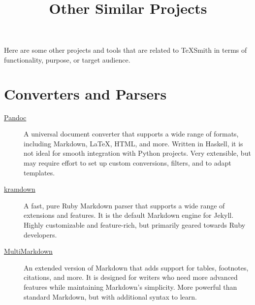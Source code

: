 \documentclass[a4paper,twoside]{article}
\title{Other Similar Projects}
\author{}\date{}
\begin{document}
\maketitle
Here are some other projects and tools that are related to TeXSmith in terms of functionality, purpose, or target audience.
\section{Converters and Parsers}
\begin{description}
\item[{\href{https://pandoc.org/}{Pandoc}}] A universal document converter that supports a wide range of formats, including Markdown, \LaTeX{}, HTML, and more. Written in Haskell, it is not ideal for smooth integration with Python projects. Very extensible, but may require effort to set up custom conversions, filters, and to adapt templates.
\item[{\href{https://kramdown.gettalong.org/}{kramdown}}] A fast, pure Ruby Markdown parser that supports a wide range of extensions and features. It is the default Markdown engine for Jekyll. Highly customizable and feature-rich, but primarily geared towards Ruby developers.
\item[{\href{https://fletcherpenney.net/multimarkdown/}{MultiMarkdown}}] An extended version of Markdown that adds support for tables, footnotes, citations, and more. It is designed for writers who need more advanced features while maintaining Markdown's simplicity. More powerful than standard Markdown, but with additional syntax to learn.
\end{description}
\end{document}
